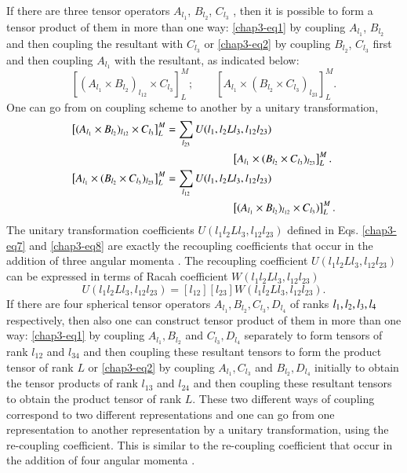 If there are three tensor operators $A_{l_1}$, $B_{l_2}$, $C_{l_3}$ , then it is possible to form a tensor product of them in more than one way: \eqref{chap3-eq1} by coupling $A_{l_1}$, $B_{l_2}$ and then coupling the resultant with $C_{l_3}$ or \eqref{chap3-eq2} by coupling $B_{l_2}$, $C_{l_3}$ first and then coupling $A_{l_1}$ with the resultant, as indicated below:
\begin{equation}
\left[ (A_{l_1} \times B_{l_2})_{l_{12}} \times C_{l_3}\right]^M_L;  \qquad \left[ A_{l_1} \times (B_{l_2} \times C_{l_3})_{l_{23}}\right]^M_L. \label{chap3-eq6}
\end{equation}
One can go from on coupling scheme to another by a unitary transformation,
\begin{align}
\left[ (A_{l_1} \times B_{l_2})_{l_{12}} \times C_{l_3}\right]^M_L  & = \sum_{l_{23}} U (l_1, l_2 L l_3, l_{12} l_{23})\notag \\ 
& \qquad \qquad \qquad \left[A_{l_1} \times (B_{l_2} \times C_{l_3})_{l_{23}} \right]^M_L. \label{chap3-eq7}\\ 
\left[ A_{l_1} \times (B_{l_2} \times C_{l_3})_{l_{23}}\right]^M_L & = \sum_{l_{12}} U (l_1, l_2 L l_3, l_{12} l_{23}) \notag \\
& \qquad \qquad \qquad \left[(A_{l_1} \times B_{l_2})_{l_{12}} \times C_{l_3}) \right]^M_L. \label{chap3-eq8} 
\end{align}
The unitary transformation coefficients $U (l_1 l_2 L l_3, l_{12} l_{23})$ defined in Eqs. \eqref{chap3-eq7} and \eqref{chap3-eq8} are exactly the recoupling coefficients that occur in the addition of three angular momenta \cite{chap3-key11,chap3-key12}. The recoupling coefficient $U (l_1 l_2 Ll_3 , l_{12} l_{23})$ can be expressed in terms of Racah coefficient $W (l_1 l_2 Ll_3 , l_{12} l_{23})$ 
\begin{equation}
U (l_1 l_2 Ll_3 , l_{12} l_{23}) = [l_{12}][l_{23}] W (l_{1} l_2 Ll_3 , l_{12} l_{23}). \label{chap3-eq9}
\end{equation}
If there are four spherical tensor operators $A_{l_1}, B_{l_2}, C_{l_3}, D_{l_4}$ of ranks $l_1, l_2,\break l_3, l_4$ respectively, then also one can construct tensor product of them in more than one way: \eqref{chap3-eq1} by coupling $A_{l_1}, B_{l_2}$ and $C_{l_3}, D_{l_4}$ separately to form tensors of rank $l_{12}$ and $l_{34}$ and then coupling these resultant tensors to form the product tensor of rank $L$ or \eqref{chap3-eq2} by coupling $A_{l_1}, C_{l_3}$ and $B_{l_2}, D_{l_4}$ initially to obtain the tensor products of rank $l_{13}$ and $l_{24}$ and then coupling these resultant tensors to obtain the product tensor of rank $L$. These two different ways of coupling correspond to two different representations and one can go from one representation to another representation by a unitary transformation, using the re-coupling coefficient. This is similar to the re-coupling coefficient that occur in the addition of four angular momenta \cite{chap3-key11,chap3-key12}.

